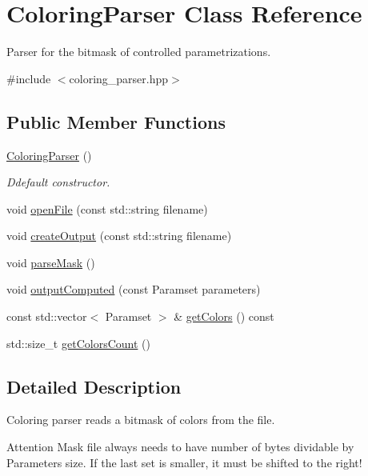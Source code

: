 \hypertarget{classColoringParser}{\section{\-Coloring\-Parser \-Class \-Reference}
\label{classColoringParser}
}


\-Parser for the bitmask of controlled parametrizations.  




{\ttfamily \#include $<$coloring\-\_\-parser.\-hpp$>$}

\subsection*{\-Public \-Member \-Functions}
\begin{DoxyCompactItemize}
\item 
\hypertarget{classColoringParser_a4d741a7e828ea56737c90c5e0bef3397}{\hyperlink{classColoringParser_a4d741a7e828ea56737c90c5e0bef3397}{\-Coloring\-Parser} ()}\label{classColoringParser_a4d741a7e828ea56737c90c5e0bef3397}

\begin{DoxyCompactList}\small\item\em \-Ddefault constructor. \end{DoxyCompactList}\item 
void \hyperlink{classColoringParser_ade0d6f3c6e50b90cdc94f9d0debb86c0}{open\-File} (const std\-::string filename)
\item 
void \hyperlink{classColoringParser_a8f08d87f82c952f814fef8cbd8f670ee}{create\-Output} (const std\-::string filename)
\item 
void \hyperlink{classColoringParser_a2de61114bb7c1491df9597be18cfa466}{parse\-Mask} ()
\item 
void \hyperlink{classColoringParser_a6fdaf4ec8dd027f73a3843b6683b1562}{output\-Computed} (const \-Paramset parameters)
\item 
const std\-::vector$<$ \-Paramset $>$ \& \hyperlink{classColoringParser_af0ba47e1f7201b88aeaa70b51886ca6f}{get\-Colors} () const 
\item 
std\-::size\-\_\-t \hyperlink{classColoringParser_a9fe867c4b09ad02892ddda8da2f80a12}{get\-Colors\-Count} ()
\end{DoxyCompactItemize}


\subsection{\-Detailed \-Description}
\-Coloring parser reads a bitmask of colors from the file. \begin{DoxyAttention}{\-Attention}
\-Mask file always needs to have number of bytes dividable by \-Parameters size. \-If the last set is smaller, it must be shifted to the right! 
\end{DoxyAttention}


